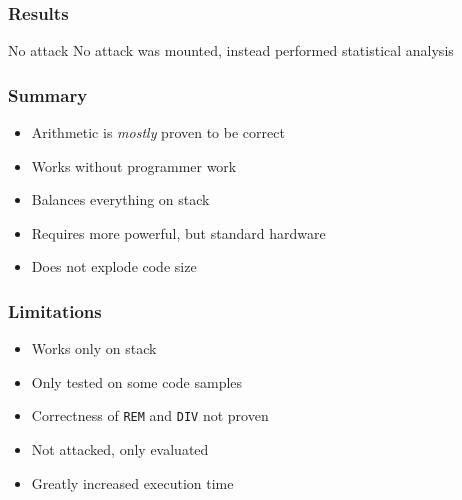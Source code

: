 \documentclass[11pt,t,usepdftitle=false,aspectratio=169]{beamer}
\begin{document}
\begin{frame}[label=results]
  \frametitle{Results}
  \begin{alertblock}{No attack}
    No attack was mounted, instead performed statistical analysis
  \end{alertblock}
  \center
  \vfill
\end{frame}



\begin{frame}
  \frametitle{Summary}
  \vfill
  \begin{itemize}
  \item Arithmetic is \emph{mostly} proven to be correct
  \item Works without programmer work
  \item Balances everything on stack
  \item Requires more powerful, but standard hardware
  \item Does not explode code size
  \end{itemize}
  \vfill
\end{frame}

\begin{frame}
  \frametitle{Limitations}
  \vfill
  \begin{itemize}
  \item Works only on stack
  \item Only tested on some code samples
  \item Correctness of \texttt{REM} and \texttt{DIV} not proven
  \item Not attacked, only evaluated
  \item Greatly increased execution time
  \end{itemize}
  \vfill
\end{frame}
\end{document}
